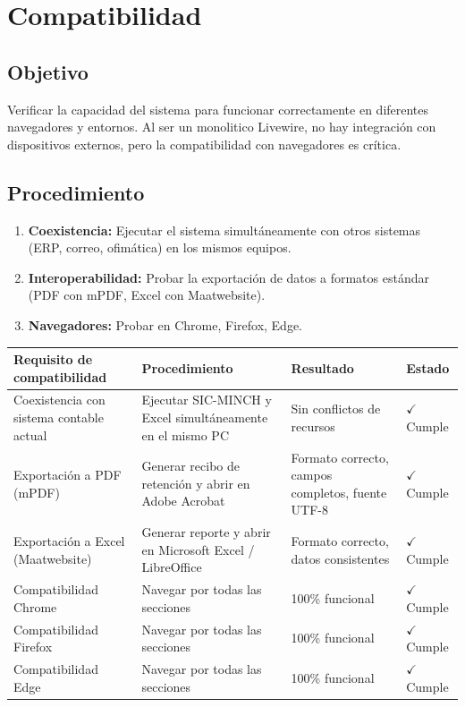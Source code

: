 \documentclass[stu]{apa7}
\begin{document}
\section{Compatibilidad}

\subsection{Objetivo}

Verificar la capacidad del sistema para funcionar correctamente en diferentes navegadores y entornos. Al ser un monolitico Livewire, no hay integración con dispositivos externos, pero la compatibilidad con navegadores es crítica.

\subsection{Procedimiento}

\begin{enumerate}
    \item \textbf{Coexistencia:} Ejecutar el sistema simultáneamente con otros sistemas (ERP, correo, ofimática) en los mismos equipos.
    \item \textbf{Interoperabilidad:} Probar la exportación de datos a formatos estándar (PDF con mPDF, Excel con Maatwebsite).
    \item \textbf{Navegadores:} Probar en Chrome, Firefox, Edge.
\end{enumerate}

\begin{longtable}{|L{4.5cm}|L{5cm}|C{3cm}|C{1.5cm}|}
\hline
{}
\textbf{Requisito de compatibilidad} & \textbf{Procedimiento} & \textbf{Resultado} & \textbf{Estado} \\
\hline
Coexistencia con sistema contable actual & Ejecutar SIC-MINCH y Excel simultáneamente en el mismo PC & Sin conflictos de recursos & $\checkmark$ Cumple \\
\hline
Exportación a PDF (mPDF) & Generar recibo de retención y abrir en Adobe Acrobat & Formato correcto, campos completos, fuente UTF-8 & $\checkmark$ Cumple \\
\hline
Exportación a Excel (Maatwebsite) & Generar reporte y abrir en Microsoft Excel / LibreOffice & Formato correcto, datos consistentes & $\checkmark$ Cumple \\
\hline
Compatibilidad Chrome & Navegar por todas las secciones & 100\% funcional & $\checkmark$ Cumple \\
\hline
Compatibilidad Firefox & Navegar por todas las secciones & 100\% funcional & $\checkmark$ Cumple \\
\hline
Compatibilidad Edge & Navegar por todas las secciones & 100\% funcional & $\checkmark$ Cumple \\
\hline
\end{longtable}
\end{document}
